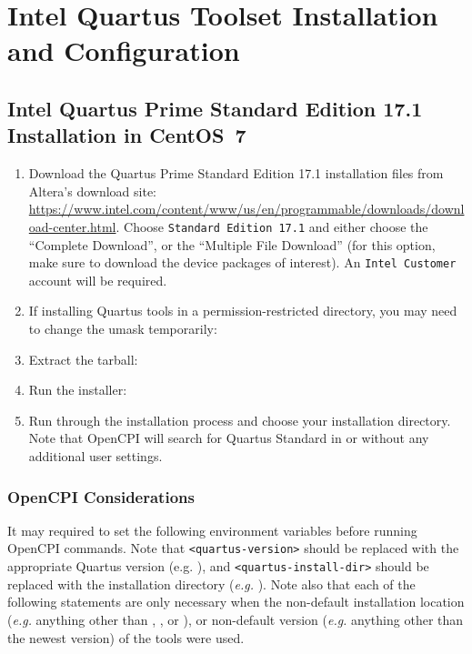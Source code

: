 \newpage

\section{Intel Quartus Toolset Installation and Configuration}
\subsection{Intel Quartus Prime Standard Edition 17.1 Installation in CentOS~7}
\begin{flushleft}
\begin{enumerate}
	\item Download the Quartus Prime Standard Edition 17.1 installation files from Altera's download site: \url{https://www.intel.com/content/www/us/en/programmable/downloads/download-center.html}. Choose \verb+Standard Edition 17.1+ and either choose the ``Complete Download'', or the ``Multiple File Download'' (for this option, make sure to download the device packages of interest). An \verb+Intel Customer+ account will be required.
\item If installing Quartus tools in a permission-restricted directory, you may need to change the umask temporarily:\newline
{}\newline
{}
\item Extract the tarball:\newline
{}
\item Run the installer:\newline
{}\newline
\item Run through the installation process and choose your installation directory. Note that OpenCPI will search for Quartus Standard in  or  without any additional user settings.
\end{enumerate}

\subsubsection{OpenCPI Considerations}
It may required to set the following environment variables before running OpenCPI commands. Note that \texttt{<quartus-version>} should be replaced with the appropriate Quartus version (e.g. ), and \texttt{<quartus-install-dir>} should be replaced with the installation directory (\textit{e.g.} ). Note also that each of the following  statements are only necessary when the non-default installation location (\textit{e.g.} anything other than , ,  or ), or non-default version (\textit{e.g.} anything other than the newest version) of the tools were used.\newline
{}\newline
{}\newline
{}


\end{flushleft}
